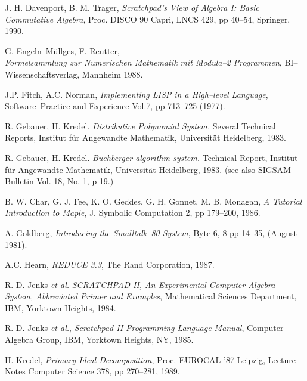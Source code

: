 \begin{thebibliography}{Stoutemyer 86}
 J. H. Davenport,
        B. M. Trager,
        {\em Scratchpad's View of Algebra I:
        Basic Commutative Algebra},
        Proc. DISCO 90 Capri, LNCS 429, pp 40--54, Springer, 1990.

        G. Engeln--M\"ullges, F. Reutter, \\
        {\em Formelsammlung zur Numerischen Mathematik
             mit Modula--2 Programmen},
        BI--Wissenschaftsverlag, Mannheim 1988.

 J.P. Fitch, A.C. Norman,
        {\em Implementing LISP in a High--level Language},
        Software--Practice and Experience Vol.7, pp 713--725 (1977).

 R. Gebauer, H. Kredel.
        {\em Distributive Polynomial System.}
        Several Technical Reports,
        Institut f\"ur Angewandte Mathematik,
        Universit\"at Heidelberg, 1983.

 R. Gebauer, H. Kredel.
        {\em Buchberger algorithm system.}
        Technical Report,
        Institut f\"ur Angewandte Mathematik,
        Universit\"at Heidelberg, 1983.
        (see also SIGSAM Bulletin Vol. 18, No. 1, p 19.)

 B. W. Char, G. J. Fee,
        K. O. Geddes, G. H. Gonnet, M. B. Monagan,
        {\em A Tutorial Introduction to Maple},
        J. Symbolic Computation 2, pp 179--200, 1986.

 A. Goldberg,
        {\em Introducing the Smalltalk--80 System},
        Byte 6, 8 pp 14--35, (August 1981).

 A.C. Hearn,
        {\em REDUCE 3.3},
        The Rand Corporation, 1987.

 R. D. Jenks {\em et al.}
        {\em SCRATCHPAD II, An Experimental Computer Algebra System,
        Abbreviated Primer and Examples},
        Mathematical Sciences Department, IBM, Yorktown Heights, 1984.

 R. D. Jenks {\em et al.},
        {\em Scratchpad II Programming Language Manual},
        Computer Algebra Group, IBM, Yorktown Heights, NY, 1985.

 H. Kredel,
        {\em Primary Ideal Decomposition},
        Proc. EUROCAL '87 Leipzig, Lecture Notes Computer Science 378,
        pp 270--281, 1989.


\end{thebibliography}
